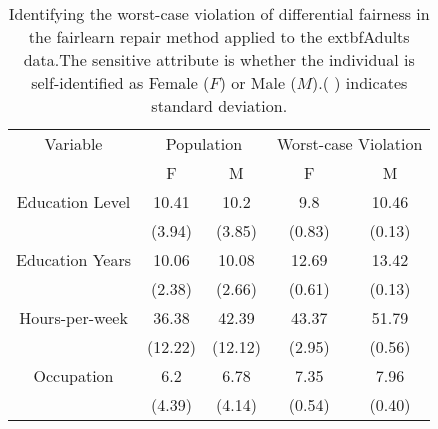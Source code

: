 \begin{table}[!t] 
\centering  
\begin{tabular}{c|cc||cc} 
Variable & \multicolumn{2}{c}{Population} & \multicolumn{2}{c}{Worst-case Violation} \\ 
 & F& M & F& M \\ 
\hline 
\hline 
Education Level & 10.41 & 10.2 & 9.8 & 10.46 \\ 
 & (\scriptsize{3.94}) & (\scriptsize{3.85}) & (\scriptsize{0.83}) & (\scriptsize{0.13}) \\ 
Education Years & 10.06 & 10.08 & 12.69 & 13.42 \\ 
 & (\scriptsize{2.38}) & (\scriptsize{2.66}) & (\scriptsize{0.61}) & (\scriptsize{0.13}) \\ 
Hours-per-week & 36.38 & 42.39 & 43.37 & 51.79 \\ 
 & (\scriptsize{12.22}) & (\scriptsize{12.12}) & (\scriptsize{2.95}) & (\scriptsize{0.56}) \\ 
Occupation & 6.2 & 6.78 & 7.35 & 7.96 \\ 
 & (\scriptsize{4.39}) & (\scriptsize{4.14}) & (\scriptsize{0.54}) & (\scriptsize{0.40}) \\ 
\end{tabular} 
\caption{Identifying the worst-case violation of differential fairness in the fairlearn repair method applied to the 	extbf{Adults} data.The sensitive attribute is whether the individual is self-identified as Female ($F$) or Male ($M$).( ) indicates standard deviation.}
\label{tab: 4}  
\end{table} 
